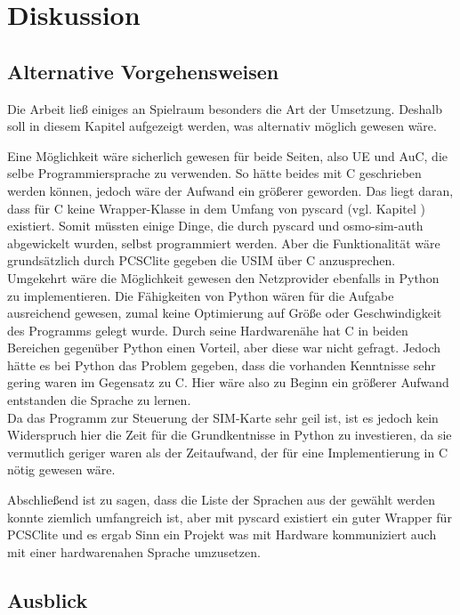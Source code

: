\clearpage

\section{Diskussion}
\label{diskussion}

	\subsection{Alternative Vorgehensweisen}
	\label{diskussion-alternative}
	
	Die Arbeit ließ einiges an Spielraum besonders die Art der Umsetzung. Deshalb soll in
	diesem Kapitel aufgezeigt werden, was alternativ möglich gewesen wäre.
	
	Eine Möglichkeit wäre sicherlich gewesen für beide Seiten, also UE und AuC, die selbe
	Programmiersprache zu verwenden. So hätte beides mit C geschrieben werden können,
	jedoch wäre der Aufwand ein größerer geworden. Das liegt daran, dass für C keine
	Wrapper-Klasse in dem Umfang von pyscard (vgl. Kapitel ) existiert.
	Somit müssten einige Dinge, die durch pyscard und osmo-sim-auth abgewickelt wurden,
	selbst programmiert werden. Aber die Funktionalität wäre grundsätzlich durch PCSClite
	gegeben die USIM über C anzusprechen. \\
	Umgekehrt wäre die Möglichkeit gewesen den Netzprovider ebenfalls in Python zu
	implementieren. Die Fähigkeiten von Python wären für die Aufgabe ausreichend gewesen,
	zumal keine Optimierung auf Größe oder Geschwindigkeit des Programms gelegt wurde.
	Durch seine Hardwarenähe hat C in beiden Bereichen gegenüber Python einen Vorteil,
	aber diese war nicht gefragt. Jedoch hätte es bei Python das Problem gegeben, dass
	die vorhanden Kenntnisse sehr gering waren im Gegensatz zu C. Hier wäre also zu Beginn
	ein größerer Aufwand entstanden die Sprache zu lernen. \\
	Da das Programm zur Steuerung der SIM-Karte sehr geil ist, ist es jedoch kein Widerspruch
	hier die Zeit für die Grundkentnisse in Python zu investieren, da sie vermutlich geriger
	waren als der Zeitaufwand, der für eine Implementierung in C nötig gewesen wäre.
	
	Abschließend ist zu sagen, dass die Liste der Sprachen aus der gewählt werden konnte
	ziemlich umfangreich ist, aber mit pyscard existiert ein guter Wrapper für PCSClite und
	es ergab Sinn ein Projekt was mit Hardware kommuniziert auch mit einer hardwarenahen
	Sprache umzusetzen.	
	
	\subsection{Ausblick}
